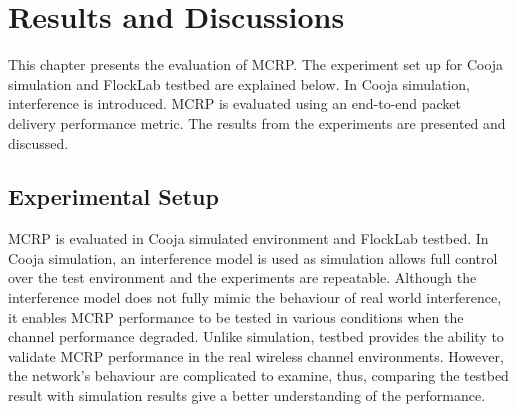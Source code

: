 \chapter{Results and Discussions}
\label{results}


This chapter presents the evaluation of MCRP. The experiment set up for Cooja simulation and FlockLab \cite{flocklab} testbed are explained below. In Cooja simulation, interference is introduced. MCRP is evaluated using an end-to-end packet delivery performance metric. The results from the experiments are presented and discussed. 


\section{Experimental Setup}
MCRP is evaluated in Cooja simulated environment and FlockLab testbed. In Cooja simulation, an interference model is used as simulation allows full control over the test environment and the experiments are repeatable. Although the interference model does not fully mimic the behaviour of real world interference, it enables MCRP performance to be tested in various conditions when the channel performance degraded. Unlike simulation, testbed provides the ability to validate MCRP performance in the real wireless channel environments. However, the network's behaviour are complicated to examine, thus, comparing the testbed result with simulation results give a better understanding of the performance. 


